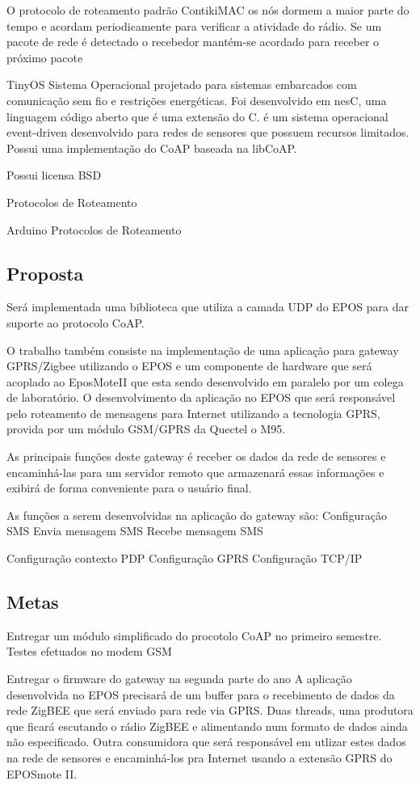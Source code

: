 O protocolo de roteamento padrão ContikiMAC os n\'os dormem a maior parte do tempo e acordam periodicamente para verificar a atividade do r\'adio. Se um pacote de rede \'e detectado o recebedor mant\'em-se acordado para receber o pr\'oximo pacote 

TinyOS Sistema Operacional projetado para sistemas embarcados com comunicação sem fio e restriç\~oes energ\'eticas. Foi desenvolvido em nesC, uma linguagem c\'odigo aberto que \'e uma extensão do C. \'e um sistema operacional event-driven desenvolvido para redes de sensores que possuem recursos limitados. Possui uma implementação do CoAP baseada na libCoAP.

Possui licensa BSD

Protocolos de Roteamento
  
Arduino Protocolos de Roteamento


\subsection{Proposta}
Ser\'a implementada uma biblioteca que utiliza a camada UDP do EPOS para dar suporte ao protocolo CoAP.

O trabalho tamb\'em consiste na implementação de uma aplicação para gateway GPRS/Zigbee utilizando o EPOS e um componente de hardware que ser\'a acoplado ao EposMoteII que esta sendo desenvolvido em paralelo por um colega de laborat\'orio. O desenvolvimento da aplicação no EPOS que ser\'a respons\'avel pelo roteamento de mensagens para Internet utilizando a tecnologia GPRS, provida por um m\'odulo GSM/GPRS da Quectel o M95.

As principais funç\~oes deste gateway \'e receber os dados da rede de sensores e encaminh\'a-las para um servidor remoto que armazenar\'a essas informaç\~oes e exibir\'a de forma conveniente para o usu\'ario final.

As funç\~oes a serem desenvolvidas na aplicação do gateway são:
Configuração SMS
Envia mensagem SMS
Recebe mensagem SMS

Configuração contexto PDP
Configuração GPRS
Configuração TCP/IP

\subsection{Metas}
Entregar um m\'odulo simplificado do procotolo CoAP no primeiro semestre.
Testes efetuados no modem GSM

Entregar o firmware do gateway na segunda parte do ano A aplicação desenvolvida no EPOS precisar\'a de um buffer para o recebimento de dados da rede ZigBEE que ser\'a enviado para rede via GPRS.
Duas threads, uma produtora que ficar\'a escutando o r\'adio ZigBEE e alimentando num formato de dados ainda não especificado. Outra consumidora que ser\'a respons\'avel em utlizar estes dados na rede de sensores e encaminh\'a-los pra Internet usando a extensão GPRS do EPOSmote II.

